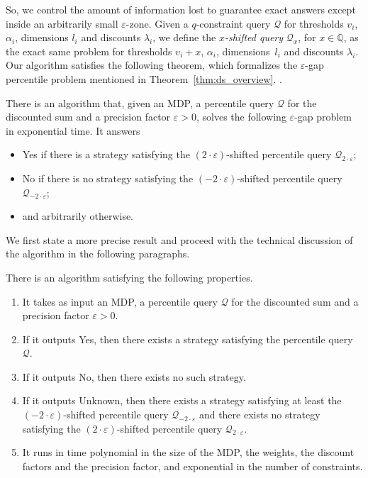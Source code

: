 \documentclass{llncs}
\newcommand{\discount}{\ensuremath{\lambda} }
\newcommand{\rat}{\ensuremath{\mathbb{Q}} }
\newcommand{\query}{\ensuremath{\mathcal{Q}} }
\begin{document}
So, we control the amount of information lost to guarantee exact answers except inside an arbitrarily small $\varepsilon$-zone.
Given a $q$-constraint query $\query$ for thresholds $v_{i}$, $\alpha_{i}$,
dimensions $l_{i}$ and discounts $\discount_{i}$, we define the
\textit{$x$-shifted query} $\query_{x}$, for $x \in \rat$, as the exact same
problem for thresholds $v_{i}+x$, $\alpha_{i}$, dimensions~$l_{i}$ and discounts
$\discount_{i}$. Our algorithm satisfies the following theorem, which formalizes
the $\varepsilon$-gap percentile problem mentioned in
Theorem~\ref{thm:ds_overview}. .
\begin{theorem}
\label{thm:ds_gap}
There is an algorithm that, given an MDP, a percentile query $\query$ for the discounted sum and a precision factor $\varepsilon > 0$, solves the following $\varepsilon$-gap problem in exponential time. It answers
\begin{itemize}
\item \textsf{Yes} if there is a strategy satisfying the $(2\cdot\varepsilon)$-shifted percentile query $\query_{2\cdot \varepsilon}$;

\item \textsf{No} if there is no strategy satisfying the $(-2\cdot\varepsilon)$-shifted percentile query $\query_{-2\cdot\varepsilon}$;

\item and arbitrarily otherwise.
\end{itemize}
\end{theorem}


We first state a more precise result and proceed with the technical discussion of the algorithm in the following paragraphs.

\begin{theorem}
\label{thm:disc_algo}
There is an algorithm satisfying the following properties.
\begin{enumerate}
\item It takes as input an MDP, a percentile query $\query$ for the discounted sum and a precision factor $\varepsilon > 0$.
\item If it outputs \textsf{Yes}, then there exists a strategy satisfying the percentile query $\query$.
\item If it outputs \textsf{No}, then there exists no such strategy.
\item If it outputs \textsf{Unknown}, then there exists a strategy satisfying at least the $(-2\cdot\varepsilon)$-shifted percentile query $\query_{-2\cdot\varepsilon}$ and there exists no strategy satisfying the $(2\cdot\varepsilon)$-shifted percentile query $\query_{2\cdot\varepsilon}$.
\item It runs in time polynomial in the size of the MDP, the weights, the discount factors and the precision factor, and exponential in the number of constraints.
\end{enumerate}
\end{theorem}
\end{document}
